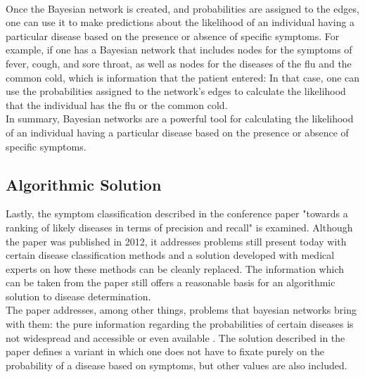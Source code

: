 \newline \\
Once the Bayesian network is created, and probabilities are assigned to the edges, one can use it to make predictions about the likelihood of an individual having a particular disease based on the presence or absence of specific symptoms. For example, if one has a Bayesian network that includes nodes for the symptoms of fever, cough, and sore throat, as well as nodes for the diseases of the flu and the common cold, which is information that the patient entered: In that case, one can use the probabilities assigned to the network's edges to calculate the likelihood that the individual has the flu or the common cold.
\newline \\
In summary, Bayesian networks are a powerful tool for calculating the likelihood of an individual having a particular disease based on the presence or absence of specific symptoms.

\subsection{Algorithmic Solution}
Lastly, the symptom classification described in the conference paper "towards a ranking of likely diseases in terms of precision and recall" \cite{.algo} is examined. Although the paper was published in 2012, it addresses problems still present today with certain disease classification methods and a solution developed with medical experts on how these methods can be cleanly replaced. The information which can be taken from the paper still offers a reasonable basis for an algorithmic solution to disease determination. 
\newline \\
The paper addresses, among other things, problems that bayesian networks bring with them: the pure information regarding the probabilities of certain diseases is not widespread and accessible or even available \cite{.algo}. The solution described in the paper defines a variant in which one does not have to fixate purely on the probability of a disease based on symptoms, but other values are also included.

